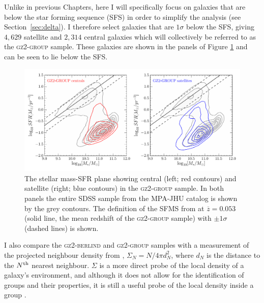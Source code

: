 Unlike in previous Chapters, here I will specifically focus on galaxies that are below the star forming sequence (SFS) in order to simplify the analysis (see Section~\ref{sec:delta}). I therefore select galaxies that are $1\sigma$ below the SFS, giving $4,629$ satellite and $2,314$ central galaxies which will collectively be referred to as the \textsc{gz2-group} sample. These galaxies are shown in the panels of Figure \ref{fig:sfrmass} and can be seen to lie below the SFS.

\begin{figure}
\centering
\includegraphics[width=\textwidth]{environment/sfr_mass_quenched_centrals_satellites_gz2_group.pdf}
\caption[Stellar mass-SFR plane for the centrals and satellites of the \textsc{gz2-group} sample]{The stellar mass-SFR plane showing central (left; red contours) and satellite (right; blue contours) in the \textsc{gz2-group} sample. In both panels the entire SDSS sample from the MPA-JHU catalog is shown by the grey contours. The definition of the SFMS from \cite{peng10} at $\overline{z} = 0.053$ (solid line, the mean redshift of the \textsc{gz2-group} sample) with $\pm1\sigma$ (dashed lines) is shown.}
\label{fig:sfrmass}
\end{figure}


I also compare the \textsc{gz2-berlind} and \textsc{gz2-group} samples with a measurement of the projected neighbour density from \cite{Baldry06}, $\Sigma_N = N/4\pi d_N^2$, where $d_N$ is the distance to the $N^{\rm{th}}$ nearest neighbour. $\Sigma$ is a more direct probe of the local density of a galaxy's environment, and although it does not allow for the identification of groups and their properties, it is still a useful probe of the local density inside a group  \cite[see][for a comparison of various environment parameterisations]{muldrew12}.

